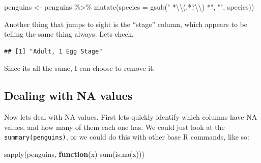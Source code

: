 \documentclass[
]{book}
\newenvironment{Shaded}{\begin{snugshade}}{\end{snugshade}}
\newcommand{\AttributeTok}[1]{\textcolor[rgb]{0.77,0.63,0.00}{#1}}
\newcommand{\ConstantTok}[1]{\textcolor[rgb]{0.00,0.00,0.00}{#1}}
\newcommand{\ControlFlowTok}[1]{\textcolor[rgb]{0.13,0.29,0.53}{\textbf{#1}}}
\newcommand{\FunctionTok}[1]{\textcolor[rgb]{0.00,0.00,0.00}{#1}}
\newcommand{\NormalTok}[1]{#1}
\newcommand{\OtherTok}[1]{\textcolor[rgb]{0.56,0.35,0.01}{#1}}
\newcommand{\SpecialCharTok}[1]{\textcolor[rgb]{0.00,0.00,0.00}{#1}}
\newcommand{\StringTok}[1]{\textcolor[rgb]{0.31,0.60,0.02}{#1}}
\begin{document}
\begin{Shaded}
\begin{Highlighting}[]
\NormalTok{penguins }\OtherTok{\textless{}{-}}\NormalTok{ penguins }\SpecialCharTok{\%\textgreater{}\%} 
  \FunctionTok{mutate}\NormalTok{(}\AttributeTok{species =} \FunctionTok{gsub}\NormalTok{(}\StringTok{" *}\SpecialCharTok{\textbackslash{}\textbackslash{}}\StringTok{(.*?}\SpecialCharTok{\textbackslash{}\textbackslash{}}\StringTok{) *"}\NormalTok{, }\StringTok{""}\NormalTok{, species))}
\end{Highlighting}
\end{Shaded}

Another thing that jumps to sight is the ``stage'' column, which appears to be telling the same thing always.
Lets check.

\begin{Shaded}
\end{Shaded}

\begin{verbatim}
## [1] "Adult, 1 Egg Stage"
\end{verbatim}

Since its all the same, I can choose to remove it.

\begin{Shaded}
\end{Shaded}

\hypertarget{dealing-with-na-values}{%
\subsection{Dealing with NA values}\label{dealing-with-na-values}}

Now lets deal with NA values.
First lets quickly identify which columns have NA values, and how many of them each one has.
We could just look at the \texttt{summary(penguins)}, or we could do this with other base R commands, like so:

\begin{Shaded}
\begin{Highlighting}[]
\FunctionTok{sapply}\NormalTok{(penguins, }\ControlFlowTok{function}\NormalTok{(x) }\FunctionTok{sum}\NormalTok{(}\FunctionTok{is.na}\NormalTok{(x)))}
\end{Highlighting}
\end{Shaded}
\end{document}
